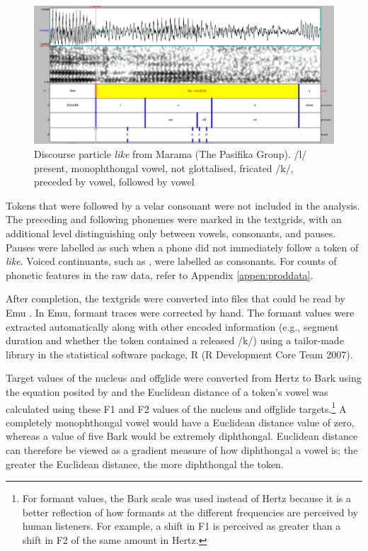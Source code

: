 \begin{figure}[p]
	\centering
		\includegraphics[width=5in]{images/brenda15.jpg}
	\caption{Discourse particle \textit{like} from Marama (The Pasifika Group). /l/ present, monophthongal vowel, not glottalised, fricated /k/, preceded by vowel, followed by vowel}
	\label{fig:brenda15}
\end{figure}





Tokens that were followed by a velar consonant were not included in the analysis. The preceding and following pho\-nemes were marked in the text\-grids, with an additional level distinguishing only between vowels, consonants, and pauses. Pauses were labelled as such when a phone did not immediately follow a token of \textit{like}. Voiced continuants, such as , were labelled as consonants. For counts of phonetic features in the raw data, refer to Appendix \ref{appen:proddata}. 


After completion, the textgrids were converted into files that could be read by Emu \citep{emu}. In Emu, formant traces were corrected by hand. The formant values were extracted automatically along with other encoded information (e.g., segment duration and whether the token contained a released /k/) using a tailor-made library in the statistical software package, R (R Development Core Team 2007). 

Target values of the nucleus and offglide were converted from Hertz to Bark using the equation posited by \citet{traunmuller1990} and the Euclidean distance of a token's vowel was calculated using these F1 and F2 values of the nucleus and offglide targets.\footnote{For formant values, the Bark scale was used instead of Hertz because it is a better reflection of how formants at the different frequencies are perceived by human listeners. For example, a shift in F1 is perceived as greater than a shift in F2 of the same amount in Hertz.} A completely monophthongal vowel would have a Euclidean distance value of zero, whereas a value of five Bark would be extremely diphthongal. Euclidean distance can therefore be viewed as a gradient measure of how diphthongal a vowel is; the greater the Euclidean distance, the more diphthongal the token. 
\nocite{r}


